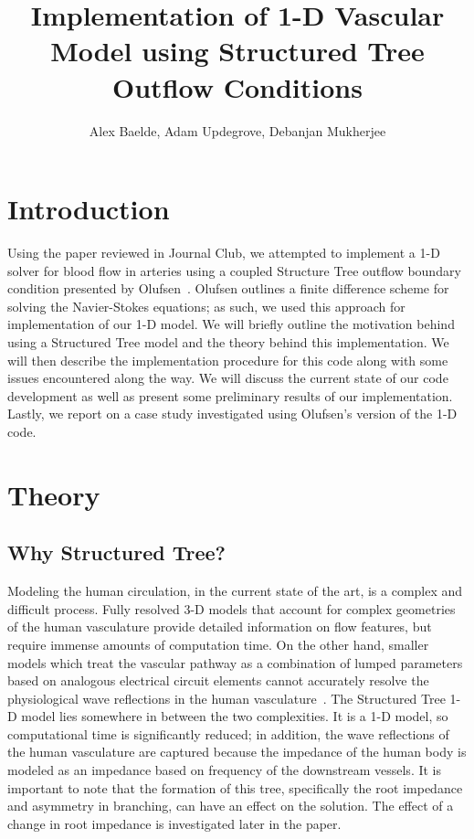 \documentclass[12pt]{article}
\title{Implementation of 1-D Vascular Model using Structured Tree Outflow Conditions}
\author{Alex Baelde, Adam Updegrove, Debanjan Mukherjee}
\begin{document}
\maketitle
\section{Introduction}
Using the paper reviewed in Journal Club, we attempted to implement a 1-D solver for blood flow in arteries using a coupled Structure Tree outflow boundary condition presented by Olufsen~\cite{structuredtree}. Olufsen outlines a finite difference scheme for solving the Navier-Stokes equations; as such, we used this approach for implementation of our 1-D model. We will briefly outline the motivation behind using a Structured Tree model and the theory behind this implementation.%
We will then describe the implementation procedure for this  code along with some issues encountered along the way. We will discuss the current state of our code development as well as present some preliminary results of our implementation. Lastly, we report on a case study investigated using Olufsen's version of the 1-D code. 

\section{Theory}

\subsection{Why Structured Tree?}

Modeling the human circulation, in the current state of the art, is a complex and difficult process. Fully resolved 3-D models that account for complex geometries of the human vasculature provide detailed information on flow features, but require immense amounts of computation time. On the other hand, smaller models which treat the vascular pathway as a combination of lumped parameters based on analogous electrical circuit elements cannot accurately resolve the physiological wave reflections in the human vasculature~\cite{structuredtree}. The Structured Tree 1-D model lies somewhere in between the two complexities. It is a 1-D model, so computational time is significantly reduced; in addition, the wave reflections of the human vasculature are captured because the impedance of the human body is modeled as an impedance based on frequency of the downstream vessels. It is important to note that the formation of this tree, specifically the root impedance and asymmetry in branching, can have an effect on the solution. The effect of  a change in root impedance is investigated later in the paper.
\end{document}

